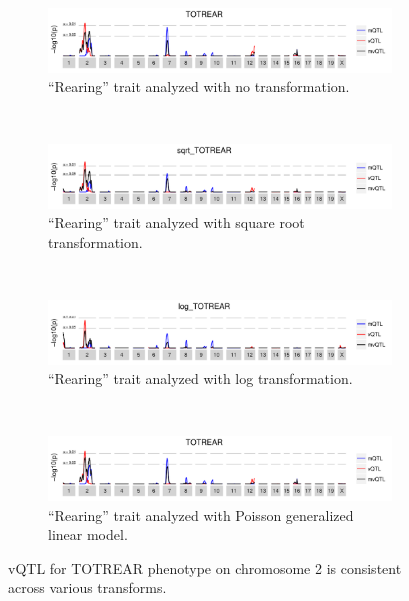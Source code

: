         \newpage
        \begin{figure}
            \centering
            \begin{subfigure}{0.9\textwidth}
                \includegraphics[width=\textwidth]{images/TOTREAR_no_transform.pdf}
                \caption{``Rearing'' trait analyzed with no transformation.}
                \label{fig:Bailey_totrear_id}
            \end{subfigure}\\
            \begin{subfigure}{0.9\textwidth}
                \includegraphics[width=\textwidth]{images/TOTREAR_sqrt.pdf}
                \caption{``Rearing'' trait analyzed with square root transformation.}
                \label{fig:Bailey_totrear_squareroot}
            \end{subfigure}\\
            \begin{subfigure}{0.9\textwidth}
                \includegraphics[width=\textwidth]{images/TOTREAR_log.pdf}
                \caption{``Rearing'' trait analyzed with log transformation.}
                \label{fig:Bailey_totrear_log}
            \end{subfigure}\\
            \begin{subfigure}{0.9\textwidth}
                \includegraphics[width=\textwidth]{images/TOTREAR_poisson.pdf}
                \caption{``Rearing'' trait analyzed with Poisson generalized linear model.}
                \label{fig:Bailey_totrear_poisson}
            \end{subfigure}
            \caption{vQTL for TOTREAR phenotype on chromosome 2 is consistent across various transforms.}
            \label{fig:Bailey_totrear_transforms}           
        \end{figure}
